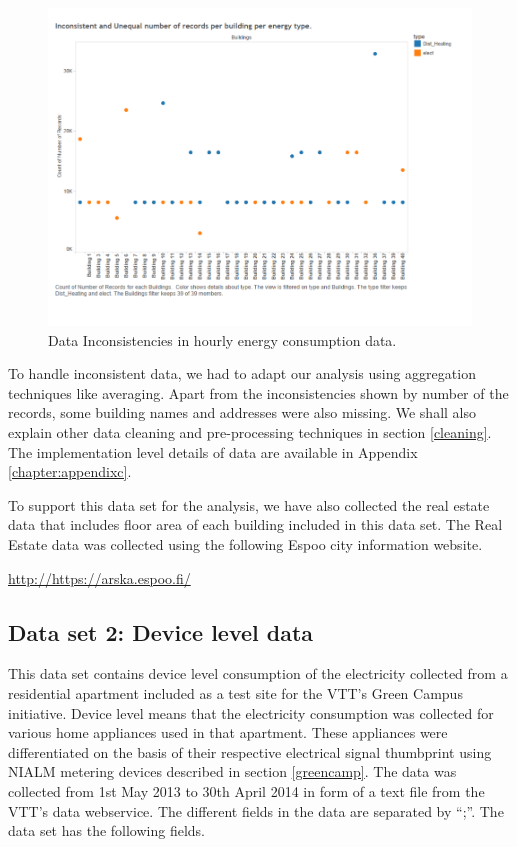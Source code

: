 \begin{figure}[!ht]
    \begin{center}
      \includegraphics[width=\textwidth]{images/incon.pdf}
      \caption{Data Inconsistencies in hourly energy consumption data.}
      \label{fig:incon}
    \end{center}
  \end{figure} 
To handle inconsistent data, we had to adapt our analysis using aggregation techniques like averaging. Apart from the inconsistencies shown by number of the records, some building names and addresses were also missing. We shall also explain other data cleaning and pre-processing techniques in section \ref{cleaning}. The implementation level details of data are available in Appendix \ref{chapter:appendixc}.

To support this data set for the analysis, we have also collected the real estate data that includes floor area of each building included in this data set. The Real Estate data was collected using the following Espoo city information website.
\begin{center}\url{http://https://arska.espoo.fi/}\end{center}


\subsection{Data set 2: Device level data} \label{nialmset}
This data set contains device level consumption of the electricity collected from a residential apartment included as a test site for the VTT's Green Campus initiative. Device level means that the electricity consumption was collected for various home appliances used in that apartment. These appliances were differentiated on the basis of their respective electrical signal thumbprint using NIALM metering devices described in section \ref{greencamp}. The data was collected from 1st May 2013 to 30th April 2014 in form of a text file from the VTT's data webservice. The different fields in the data are separated by ``;''. The data set has the following fields.

